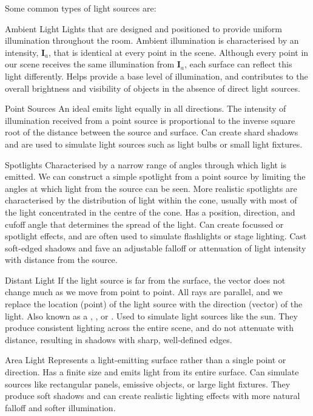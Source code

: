\documentclass[../COS3712_Notes.tex]{subfiles}
\begin{document}
        Some common types of light sources are:
        \begin{descriptenum}
          \item[Ambient Light] Lights that are designed and positioned to provide uniform
            illumination throughout the room.
            Ambient illumination is characterised by an intensity, $\mathbf{I}_a$,
            that is identical at every point in the scene.
            Although every point in our scene receives the same illumination from $\mathbf{I}_a$,
            each surface can reflect this light differently.
            Helps provide a base level of illumination, and contributes to the overall
            brightness and visibility of objects in the absence of direct light sources.
          \item[Point Sources] An ideal  emits light equally
            in all directions.
            The intensity of illumination received from a point source is proportional to the
            inverse square root of the distance between the source and surface.
            Can create shard shadows and are used to simulate light sources such as light bulbs
            or small light fixtures.
          \item[Spotlights] Characterised by a narrow range of angles through which light is
            emitted.
            We can construct a simple spotlight from a point source by limiting the angles
            at which light from the source can be seen.
            More realistic spotlights are characterised by the distribution of light
            within the cone, usually with most of the light concentrated in the
            centre of the cone.
            Has a position, direction, and cufoff angle that determines the spread of the light.
            Can create focussed or spotlight effects, and are often used to simulate
            flashlights or stage lighting.
            Cast soft-edged shadows and fave an adjustable falloff or attenuation of light intensity
            with distance from the source.
          \item[Distant Light] If the light source is far from the surface, the vector
            does not change much as we move from point to point.
            All rays are parallel, and we replace the location (point) of the light source
            with the direction (vector) of the light.
            Also known as a , ,
            or .
            Used to simulate light sources like the sun.
            They produce consistent lighting across the entire scene, and do not attenuate
            with distance, resulting in shadows with sharp, well-defined edges.
          \item[Area Light] Represents a light-emitting surface rather than a single point or
            direction.
            Has a finite size and emits light from its entire surface.
            Can simulate sources like rectangular panels, emissive objects, or large light fixtures.
            They produce soft shadows and can create realistic lighting effects with more
            natural falloff and softer illumination.
        \end{descriptenum}
\end{document}
